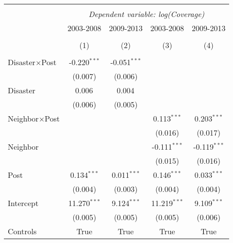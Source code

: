 
\begin{tabular}{@{\extracolsep{5pt}}lcccc}
\\[-1.8ex]\hline
\hline \\[-1.8ex]
& \multicolumn{4}{c}{\textit{Dependent variable: log(Coverage)}} \
\cr \cline{2-5}
\\[-1.8ex] & \multicolumn{1}{c}{2003-2008} & \multicolumn{1}{c}{2009-2013} & \multicolumn{1}{c}{2003-2008} & \multicolumn{1}{c}{2009-2013}  \\
\\[-1.8ex] & (1) & (2) & (3) & (4) \\
\hline \\[-1.8ex]
 Disaster$\times$Post & -0.220$^{***}$ & -0.051$^{***}$ & & \\
& (0.007) & (0.006) & & \\
 Disaster & 0.006$^{}$ & 0.004$^{}$ & & \\
& (0.006) & (0.005) & & \\
 Neighbor$\times$Post & & & 0.113$^{***}$ & 0.203$^{***}$ \\
& & & (0.016) & (0.017) \\
 Neighbor & & & -0.111$^{***}$ & -0.119$^{***}$ \\
& & & (0.015) & (0.016) \\
 Post & 0.134$^{***}$ & 0.011$^{***}$ & 0.146$^{***}$ & 0.033$^{***}$ \\
& (0.004) & (0.003) & (0.004) & (0.004) \\
Intercept & 11.270$^{***}$ & 9.124$^{***}$ & 11.219$^{***}$ & 9.109$^{***}$ \\
& (0.005) & (0.005) & (0.005) & (0.006) \\
Controls & True & True & True & True \\

\end{tabular}
